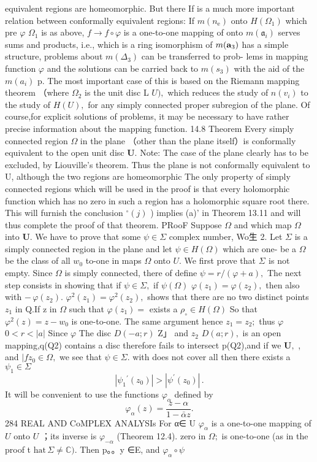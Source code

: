equivalent regions are homeomorphic. But there If is a much more important relation between conformally equivalent regions: If $m(n_{\mathrm{e}})$ onto $H(\Omega_{1})$ which pre $\varphi$ $\Omega_{1}$ is as above, $f\to f\circ\varphi$ is a one-to-one mapping of onto $m({\mathfrak{a}}_{i})$ serves sums and products, i.e., which is a ring isomorphism of $m({\bf a}_{3})$ has a simple structure, problems about $\scriptstyle{m(\Delta_{3})}$ can be transferred to prob- lems in mapping function $\varphi$ and the solutions can be carried back to $\scriptstyle{m(s_{3})}$ with the aid of the $m(a_{i})$ p. The most important case of this is based on the Riemann mapping theorem （where $\Omega_{2}$ is the unit disc L $U),$ which reduces the study of $\scriptstyle n(v_{i})$ to the study of $H(U),$ for any simply connected proper subregion of the plane. Of course,for explicit solutions of problems, it may be necessary to have rather precise information about the mapping function. 14.8 Theorem Every simply connected region $\Omega$ in the plane （other than the plane itself）is conformally equivalent to the open unit disc ${\boldsymbol{U}}.$ Note: The case of the plane clearly has to be excluded, by Liouville's theorem. Thus the plane is not conformally equivalent to U, although the two regions are homeomorphic The only property of simply connected regions which will be used in the proof is that every holomorphic function which has no zero in such a region has a holomorphic square root there. This will furnish the conclusion $^{\circ}(j)$ ) implies (a)’ in Theorem 13.11 and will thus complete the proof of that theorem. PRooF Suppose $\Omega$ and which map $\Omega$ into ${\boldsymbol{U}}.$ We have to prove that some $\psi\in\Sigma$ complex number, Wo生 2. Let $\Sigma$ is a simply connected region in the plane and let $\psi\in H(\Omega)$ which are one- be a $\Omega$ be the class of all $w_{0}$ to-one in maps $\Omega$ onto $U.$ We first prove that $\Sigma_{}^{}$ is not empty. Since $\Omega$ is simply connected, there of define $\psi=r/(\varphi+a),$ The next step consists in showing that if $\psi\in\Sigma,$ if $\psi(\Omega)$ $\varphi(z_{1})=\varphi(z_{2}),$ then also with $-\,\varphi(z_{2}).$ $\varphi^{2}(z_{1})=\varphi^{2}(z_{2}),$ shows that there are no two distinct points $z_{1}$ in Q.If z in $\Omega$ such that $\varphi(z_{1})=$ exists a $\rho_{\circ}\in H(\Omega)$ So that $\varphi^{2}(z)=z-w_{0}$ is one-to-one. The same argument hence $z_{1}=z_{2};$ thus $\varphi$ $0<r<|a|$ Since $\varphi$ The disc $D(-a;r)$ Z」 and $z_{2}$ $D(a;r),$ is an open mapping,q(Q2) contains a disc therefore fails to intersect p(Q2),and if we ${\boldsymbol{U}},$ , and $|f z_{0}\in\Omega,$ we see that $\psi\in\Sigma.$ with does not cover all then there exists a $\psi_{1}\in\Sigma$ $$ |\psi_{1}{}^{\prime}(z_{0})|>|\psi^{\prime}(z_{0})|\,. $$ It will be convenient to use the functions $\varphi_{\alpha}$ defined by $$ \varphi_{\alpha}(z)={\frac{z-\alpha}{1-\bar{\alpha}z}}. $$284 REAL AND CoMPLEX ANALYSIs For α∈ U $\varphi_{\alpha}$ is a one-to-one mapping of $U$ onto $U$ ；its inverse is $\varphi_{-\alpha}$ (Theorem 12.4). zero in $\Omega;$ is one-to-one (as in the proof t ${\mathrm{hat}}\,\Sigma\neq\mathbb{C}).$ Then p。。y ∈E, and $\varphi_{\alpha}\circ\psi$ 